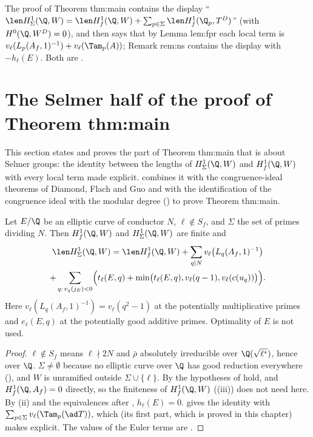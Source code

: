 \begin{paperlink}
The proof of Theorem thm:main contains the display
``$\len H^1_\Sigma(\Q,W)=\len H^1_f(\Q,W)+\sum_{p\in\Sigma}\len H^1_f(\Q_p,T^D)$'' (with $H^0(\Q,W^D)=0$), and then says that by Lemma lem:fpr each local term is
$v_\ell(L_p(A_f,1)^{-1})+v_\ell(\Tam_p(A))$; Remark rem:ns contains the display with $-h_\ell(E)$. Both are
.
\end{paperlink}

\section[The Selmer half of Theorem thm:main]{The Selmer half of the proof of Theorem thm:main}\label{sec:blochkato:theorem}

This section states and proves the part of Theorem thm:main that is about Selmer groups: the identity between the lengths of $H^1_\Sigma(\Q,W)$ and $H^1_f(\Q,W)$ with
every local term made explicit.  combines it with the congruence-ideal theorems of Diamond, Flach and Guo and with the identification of the
congruence ideal with the modular degree () to prove Theorem thm:main.

\begin{theorem}\label{thm:blochkato:selmer-identity}
Let $E/\Q$ be an elliptic curve of conductor $N$, $\ell\notin S_f$, and $\Sigma$ the set of primes dividing $N$. Then $H^1_f(\Q,W)$ and $H^1_\Sigma(\Q,W)$ are finite and
\begin{multline*}
\len H^1_\Sigma(\Q,W)=\len H^1_f(\Q,W)+\sum_{q\mid N}v_\ell\bigl(L_q(A_f,1)^{-1}\bigr)\\
+\sum_{q:\,v_q(j_E)<0}\Bigl(t_\ell(E,q)+\min\bigl(t_\ell(E,q),v_\ell(q-1),v_\ell(c(u_q))\bigr)\Bigr).
\end{multline*}
Here $v_\ell(L_q(A_f,1)^{-1})=v_\ell(q^2-1)$ at the potentially multiplicative primes and $e_\ell(E,q)$ at the potentially good additive primes. Optimality of $E$ is not used.
\end{theorem}

\begin{proof}
$\ell\notin S_f$ means $\ell\nmid2N$ and $\bar\rho$ absolutely irreducible over $\Q(\sqrt{\ell^*})$, hence over $\Q$. $\Sigma\ne\emptyset$ because no elliptic curve over $\Q$ has good reduction
everywhere (), and $W$ is unramified outside $\Sigma\cup\{\ell\}$. By  the hypotheses of  hold, and
$H^1_f(\Q,A_f)=0$ directly, so the finiteness of $H^1_f(\Q,W)$ ((iii)) does not need  here. By
(ii) and the equivalences after , $h_\ell(E)=0$.  gives the identity with
$\sum_{p\in\Sigma}v_\ell(\Tam_p(\ad T))$, which  (its first part, which is proved in this chapter) makes explicit. The values of the Euler terms
are .
\end{proof}

